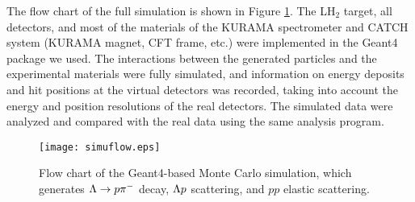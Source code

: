 The flow chart of the full simulation is shown in Figure \ref{fig-simuflow}. The LH$_{2}$ target, all detectors, and most of the materials of the KURAMA spectrometer and CATCH system (KURAMA magnet, CFT frame, etc.) were implemented in the Geant4 package we used. The interactions between the generated particles and the experimental materials were fully simulated, and information on energy deposits and hit positions at the virtual detectors was recorded, taking into account the energy and position resolutions of the real detectors. The simulated data were analyzed and compared with the real data using the same analysis program.

\begin{figure}[!h]
  \begin{center}
    \texttt{[image: simuflow.eps]}
    \caption{Flow chart of the Geant4-based Monte Carlo simulation, which generates $\Lambda\to p\pi^{-}$ decay, $\Lambda p$ scattering, and $pp$ elastic scattering.}
    \label{fig-simuflow}
  \end{center}
\end{figure}

%
